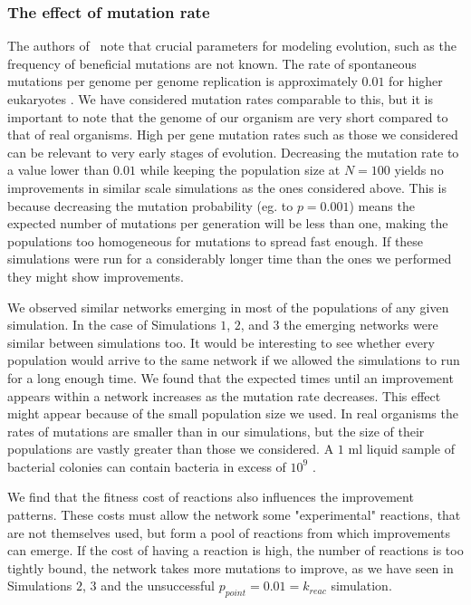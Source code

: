 \documentclass[a4paper,12pt]{article}
\begin{document}
\subsubsection*{The effect of mutation rate}
\label{sub:on_the_effect_of_the_probability_of_mutation}


The authors of \cite{predictability}~note that crucial parameters for modeling evolution, such as the frequency of beneficial mutations are not known. The rate of spontaneous mutations per genome per genome replication is approximately $0.01$ for higher eukaryotes \cite{mutationrate}. We have considered mutation rates comparable to this, but it is important to note that the genome of our organism are very short compared to that of real organisms. High per gene mutation rates such as those we considered can be relevant to very early stages of evolution. Decreasing the mutation rate to a value lower than $0.01$ while keeping the population size at $N=100$ yields no improvements in similar scale simulations as the ones considered above. This is because decreasing the mutation probability (eg. to $p=0.001$) means the expected number of mutations per generation will be less than one, making the populations too homogeneous for mutations to spread fast enough. If these simulations were run for a considerably longer time than the ones we performed they might show improvements. 

We observed similar networks emerging in most of the populations of any given simulation. In the case of Simulations $1$, $2$, and $3$ the emerging networks were similar between simulations too. It would be interesting to see whether every population would arrive to the same network if we allowed the simulations to run for a long enough time. We found that the expected times until an improvement appears within a network increases as the mutation rate decreases. This effect might appear because of the small population size we used. In real organisms the rates of mutations are smaller than in our simulations, but the size of their populations are vastly greater than those we considered. A $1$ ml liquid sample of bacterial colonies can contain bacteria in excess of $10^9$ \cite{barteklecture}.

We find that the fitness cost of reactions also influences the improvement patterns. These costs must allow the network some "experimental" reactions, that are not themselves used, but form a pool of reactions from which improvements can emerge. If the cost of having a reaction is high, the number of reactions is too tightly bound, the network takes more mutations to improve, as we have seen in Simulations $2$, $3$ and the unsuccessful $p_{point}=0.01=k_{reac}$ simulation.
\end{document}

